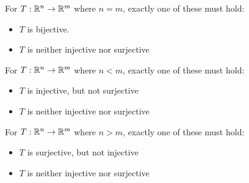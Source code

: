 \begin{applicationActivities}
\begin{observation}
For \(T:\mathbb{R}^n\to\mathbb{R}^m\) where \(n=m\), exactly one of these must hold:
\begin{itemize}
\item $T$ is bijective.
\item $T$ is neither injective nor surjective
\end{itemize}
For \(T:\mathbb{R}^n\to\mathbb{R}^m\) where \(n<m\), exactly one of these must hold:
\begin{itemize}
\item $T$ is injective, but not surjective
\item $T$ is neither injective nor surjective
\end{itemize}
For \(T:\mathbb{R}^n\to\mathbb{R}^m\) where \(n>m\), exactly one of these must hold:
\begin{itemize}
\item $T$ is surjective, but not injective
\item $T$ is neither injective nor surjective
\end{itemize}
\end{observation}

\end{applicationActivities}
